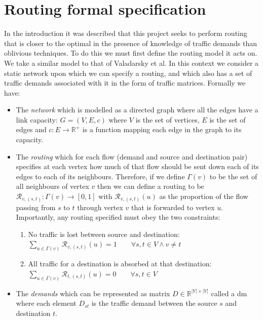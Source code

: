 \section{Routing formal specification}
\label{section:routing}
In the introduction it was described that this project seeks to perform routing that is closer to the optimal in the presence of knowledge of traffic demands than oblivious techniques. To do this we must first define the routing model it acts on. We take a similar model to that of Valadarsky et al. In this context we consider a static network upon which we can specify a routing, and which also has a set of traffic demands associated with it in the form of traffic matrices. Formally we have:
\begin{itemize}
  \item The \emph{network} which is modelled as a directed graph where all the edges have a link capacity: $G=(V,E,c)$ where $V$ is the set of vertices, $E$ is the set of edges and $c : E \rightarrow \mathbb{R}^+$ is a function mapping each edge in the graph to its capacity.
  \item The \emph{routing} which for each flow (demand and source and destination pair) specifies at each vertex how much of that flow should be sent down each of its edges to each of its neighbours. Therefore, if we define $\Gamma(v)$ to be the set of all neighbours of vertex $v$ then we can define a routing to be $\mathcal{R}_{v,(s,t)} : \Gamma(v) \rightarrow [0,1]$ with $\mathcal{R}_{v,(s,t)}(u)$ as the proportion of the flow passing from $s$ to $t$ through vertex $v$ that is forwarded to vertex $u$. Importantly, any routing specified must obey the two constraints:
    \begin{enumerate}
      \item No traffic is lost between source and destination:\\
        $\sum_{u \in \Gamma(v)}{\mathcal{R}_{v,(s,t)}(u)} = 1 \qquad \forall s, t \in V \wedge v \neq t$
      \item All traffic for a destination is absorbed at that destination:\\
        $\sum_{u \in \Gamma(v)}{\mathcal{R}_{t,(s,t)}(u)} = 0 \qquad \forall s, t \in V$
    \end{enumerate}
  \item The \emph{demands} which can be represented as matrix $D \in \mathbb{R}^{|V|\times|V|}$ called a \ac{dm} where each element $D_{st}$ is the traffic demand between the source $s$ and destination $t$.
\end{itemize}

